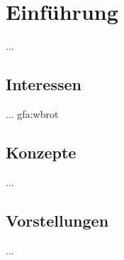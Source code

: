 %
%


\chapter{Einführung}
\label{Einführung}

...
\\





\section{Interessen}

... \gls{gfa:wbrot}
\\



\section{Konzepte}

...
\\



\section{Vorstellungen}

...
\\

